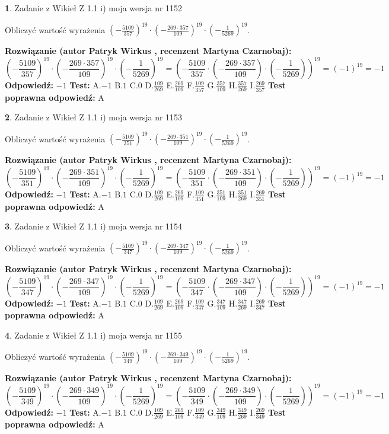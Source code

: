 \documentclass[12pt, a4paper]{article}
\theoremstyle{definition} %
\newtheorem{zad}{}
\newcommand{\zadStart}[1]{\begin{zad}#1\newline}
\newcommand{\zadStop}{\end{zad}}
\newcommand{\rozwStart}[2]{\noindent \textbf{Rozwiązanie (autor #1 , recenzent #2): }\newline}
\newcommand{\rozwStop}{\newline}
\newcommand{\odpStart}{\noindent \textbf{Odpowiedź:}\newline}
\newcommand{\odpStop}{\newline}
\newcommand{\testStart}{\noindent \textbf{Test:}\newline}
\newcommand{\testStop}{\newline}
\newcommand{\kluczStart}{\noindent \textbf{Test poprawna odpowiedź:}\newline}
\newcommand{\kluczStop}{\newline}
\begin{document}
\zadStart{Zadanie z Wikieł Z 1.1 i) moja wersja nr 1152}

Obliczyć wartość wyrażenia $(-\frac{5109}{357})^{19} \cdot (-\frac{269 \cdot 357}{109})^{19} \cdot (-\frac{1}{5269})^{19}$.
\zadStop
\rozwStart{Patryk Wirkus}{Martyna Czarnobaj}
$$(-\frac{5109}{357})^{19} \cdot (-\frac{269 \cdot 357}{109})^{19} \cdot (-\frac{1}{5269})^{19} = (-\frac{5109}{357} \cdot (-\frac{269 \cdot 357}{109}) \cdot (-\frac{1}{5269}))^{19} = (-1)^{19} = -1$$
\rozwStop
\odpStart
$-1$
\odpStop
\testStart
A.$-1$ B.$1$ C.$0$ D.$\frac{109}{269}$ E.$\frac{269}{109}$
F.$\frac{109}{357}$ G.$\frac{357}{109}$
H.$\frac{357}{269}$
I.$\frac{269}{357}$
\testStop
\kluczStart
A
\kluczStop



\zadStart{Zadanie z Wikieł Z 1.1 i) moja wersja nr 1153}

Obliczyć wartość wyrażenia $(-\frac{5109}{351})^{19} \cdot (-\frac{269 \cdot 351}{109})^{19} \cdot (-\frac{1}{5269})^{19}$.
\zadStop
\rozwStart{Patryk Wirkus}{Martyna Czarnobaj}
$$(-\frac{5109}{351})^{19} \cdot (-\frac{269 \cdot 351}{109})^{19} \cdot (-\frac{1}{5269})^{19} = (-\frac{5109}{351} \cdot (-\frac{269 \cdot 351}{109}) \cdot (-\frac{1}{5269}))^{19} = (-1)^{19} = -1$$
\rozwStop
\odpStart
$-1$
\odpStop
\testStart
A.$-1$ B.$1$ C.$0$ D.$\frac{109}{269}$ E.$\frac{269}{109}$
F.$\frac{109}{351}$ G.$\frac{351}{109}$
H.$\frac{351}{269}$
I.$\frac{269}{351}$
\testStop
\kluczStart
A
\kluczStop



\zadStart{Zadanie z Wikieł Z 1.1 i) moja wersja nr 1154}

Obliczyć wartość wyrażenia $(-\frac{5109}{347})^{19} \cdot (-\frac{269 \cdot 347}{109})^{19} \cdot (-\frac{1}{5269})^{19}$.
\zadStop
\rozwStart{Patryk Wirkus}{Martyna Czarnobaj}
$$(-\frac{5109}{347})^{19} \cdot (-\frac{269 \cdot 347}{109})^{19} \cdot (-\frac{1}{5269})^{19} = (-\frac{5109}{347} \cdot (-\frac{269 \cdot 347}{109}) \cdot (-\frac{1}{5269}))^{19} = (-1)^{19} = -1$$
\rozwStop
\odpStart
$-1$
\odpStop
\testStart
A.$-1$ B.$1$ C.$0$ D.$\frac{109}{269}$ E.$\frac{269}{109}$
F.$\frac{109}{347}$ G.$\frac{347}{109}$
H.$\frac{347}{269}$
I.$\frac{269}{347}$
\testStop
\kluczStart
A
\kluczStop



\zadStart{Zadanie z Wikieł Z 1.1 i) moja wersja nr 1155}

Obliczyć wartość wyrażenia $(-\frac{5109}{349})^{19} \cdot (-\frac{269 \cdot 349}{109})^{19} \cdot (-\frac{1}{5269})^{19}$.
\zadStop
\rozwStart{Patryk Wirkus}{Martyna Czarnobaj}
$$(-\frac{5109}{349})^{19} \cdot (-\frac{269 \cdot 349}{109})^{19} \cdot (-\frac{1}{5269})^{19} = (-\frac{5109}{349} \cdot (-\frac{269 \cdot 349}{109}) \cdot (-\frac{1}{5269}))^{19} = (-1)^{19} = -1$$
\rozwStop
\odpStart
$-1$
\odpStop
\testStart
A.$-1$ B.$1$ C.$0$ D.$\frac{109}{269}$ E.$\frac{269}{109}$
F.$\frac{109}{349}$ G.$\frac{349}{109}$
H.$\frac{349}{269}$
I.$\frac{269}{349}$
\testStop
\kluczStart
A
\kluczStop
\end{document}
